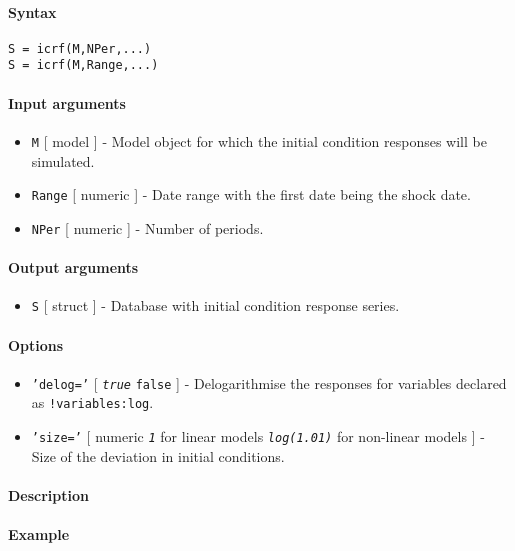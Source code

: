 


	\paragraph{Syntax}\label{syntax}

\begin{verbatim}
S = icrf(M,NPer,...)
S = icrf(M,Range,...)
\end{verbatim}

\paragraph{Input arguments}\label{input-arguments}

\begin{itemize}
\item
  \texttt{M} {[} model {]} - Model object for which the initial
  condition responses will be simulated.
\item
  \texttt{Range} {[} numeric {]} - Date range with the first date being
  the shock date.
\item
  \texttt{NPer} {[} numeric {]} - Number of periods.
\end{itemize}

\paragraph{Output arguments}\label{output-arguments}

\begin{itemize}
\itemsep1pt\parskip0pt
\item
  \texttt{S} {[} struct {]} - Database with initial condition response
  series.
\end{itemize}

\paragraph{Options}\label{options}

\begin{itemize}
\item
  \texttt{'delog='} {[} \emph{\texttt{true}} \textbar{} \texttt{false}
  {]} - Delogarithmise the responses for variables declared as
  \texttt{!variables:log}.
\item
  \texttt{'size='} {[} numeric \textbar{} \emph{\texttt{1}} for linear
  models \textbar{} \emph{\texttt{log(1.01)}} for non-linear models {]}
  - Size of the deviation in initial conditions.
\end{itemize}

\paragraph{Description}\label{description}

\paragraph{Example}\label{example}


